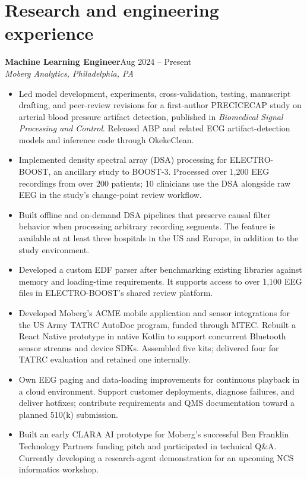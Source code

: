 \documentclass[11pt,letterpaper]{article}
\newcommand{\role}[3]{\textbf{#1}\hfill #2\\\textit{#3}\par}
\begin{document}
\section{Research and engineering experience}
\role{Machine Learning Engineer}{Aug 2024 -- Present}{Moberg Analytics, Philadelphia, PA}
\begin{itemize}
\item Led model development, experiments, cross-validation, testing, manuscript drafting, and peer-review revisions for a first-author PRECICECAP study on arterial blood pressure artifact detection, published in \textit{Biomedical Signal Processing and Control}. Released ABP and related ECG artifact-detection models and inference code through OkekeClean.
\item Implemented density spectral array (DSA) processing for ELECTRO-BOOST, an ancillary study to BOOST-3. Processed over 1,200 EEG recordings from over 200 patients; 10 clinicians use the DSA alongside raw EEG in the study's change-point review workflow.
\item Built offline and on-demand DSA pipelines that preserve causal filter behavior when processing arbitrary recording segments. The feature is available at at least three hospitals in the US and Europe, in addition to the study environment.
\item Developed a custom EDF parser after benchmarking existing libraries against memory and loading-time requirements. It supports access to over 1,100 EEG files in ELECTRO-BOOST's shared review platform.
\item Developed Moberg's ACME mobile application and sensor integrations for the US Army TATRC AutoDoc program, funded through MTEC. Rebuilt a React Native prototype in native Kotlin to support concurrent Bluetooth sensor streams and device SDKs. Assembled five kits; delivered four for TATRC evaluation and retained one internally.
\item Own EEG paging and data-loading improvements for continuous playback in a cloud environment. Support customer deployments, diagnose failures, and deliver hotfixes; contribute requirements and QMS documentation toward a planned 510(k) submission.
\item Built an early CLARA AI prototype for Moberg's successful Ben Franklin Technology Partners funding pitch and participated in technical Q\&A. Currently developing a research-agent demonstration for an upcoming NCS informatics workshop.
\end{itemize}
\end{document}
